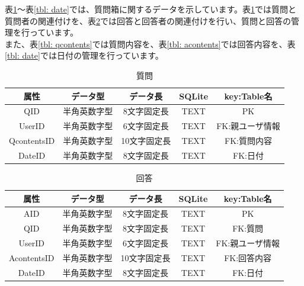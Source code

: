 \documentclass[a4j]{jarticle}
\begin{document}
表\ref{tbl: question}～表\ref{tbl: date}では、質問箱に関するデータを示しています。表\ref{tbl: question}では質問と質問者の関連付けを、表\ref{tbl: answer}では回答と回答者の関連付けを行い、質問と回答の管理を行っています。\\
また、表\ref{tbl: qcontents}では質問内容を、表\ref{tbl: acontents}では回答内容を、表\ref{tbl: date}では日付の管理を行っています。\\
\begin{table}[H]
    \caption{質問}
    \label{tbl: question}
    \begin{center}
        \begin{tabular}{|c|c|c|c|c|} \hline
            属性 & データ型 & データ長 & SQLite & key:Table名\\ \hline \hline
            QID & 半角英数字型 & 8文字固定長 & TEXT & PK\\ \hline
            UserID & 半角英数字型 & 6文字固定長 & TEXT & FK:親ユーザ情報\\ \hline
            QcontentsID & 半角英数字型 & 10文字固定長 & TEXT & FK:質問内容\\ \hline
            DateID & 半角英数字型 & 8文字固定長 & TEXT & FK:日付\\ \hline
        \end{tabular}
    \end{center}
\end{table}

\begin{table}[H]
    \caption{回答}
    \label{tbl: answer}
    \begin{center}
        \begin{tabular}{|c|c|c|c|c|} \hline
            属性 & データ型 & データ長 & SQLite & key:Table名\\ \hline \hline
            AID & 半角英数字型 & 8文字固定長 & TEXT & PK\\ \hline
            QID & 半角英数字型 & 8文字固定長 & TEXT & FK:質問\\ \hline
            UserID & 半角英数字型 & 6文字固定長 & TEXT & FK:親ユーザ情報\\ \hline
            AcontentsID & 半角英数字型 & 10文字固定長 & TEXT & FK:回答内容\\ \hline
            DateID & 半角英数字型 & 8文字固定長 & TEXT & FK:日付\\ \hline
        \end{tabular}
    \end{center}
\end{table}
\end{document}
